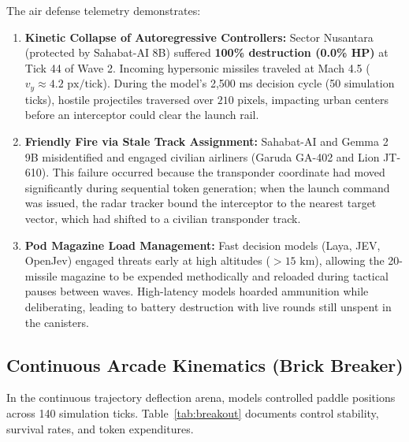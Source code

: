 \documentclass[journal,compsoc]{IEEEtran}
\begin{document}
The air defense telemetry demonstrates:
\begin{enumerate}
    \item \textbf{Kinetic Collapse of Autoregressive Controllers:} Sector Nusantara (protected by Sahabat-AI 8B) suffered \textbf{100\% destruction (0.0\% HP)} at Tick 44 of Wave 2. Incoming hypersonic missiles traveled at Mach 4.5 ($v_y \approx 4.2 \text{ px/tick}$). During the model's 2,500 ms decision cycle (50 simulation ticks), hostile projectiles traversed over $210 \text{ pixels}$, impacting urban centers before an interceptor could clear the launch rail.
    \item \textbf{Friendly Fire via Stale Track Assignment:} Sahabat-AI and Gemma 2 9B misidentified and engaged civilian airliners (Garuda GA-402 and Lion JT-610). This failure occurred because the transponder coordinate had moved significantly during sequential token generation; when the launch command was issued, the radar tracker bound the interceptor to the nearest target vector, which had shifted to a civilian transponder track.
    \item \textbf{Pod Magazine Load Management:} Fast decision models (Laya, JEV, OpenJev) engaged threats early at high altitudes ($>15 \text{ km}$), allowing the 20-missile magazine to be expended methodically and reloaded during tactical pauses between waves. High-latency models hoarded ammunition while deliberating, leading to battery destruction with live rounds still unspent in the canisters.
\end{enumerate}

\subsection{Continuous Arcade Kinematics (Brick Breaker)}
In the continuous trajectory deflection arena, models controlled paddle positions across 140 simulation ticks. Table~\ref{tab:breakout} documents control stability, survival rates, and token expenditures.
\end{document}

